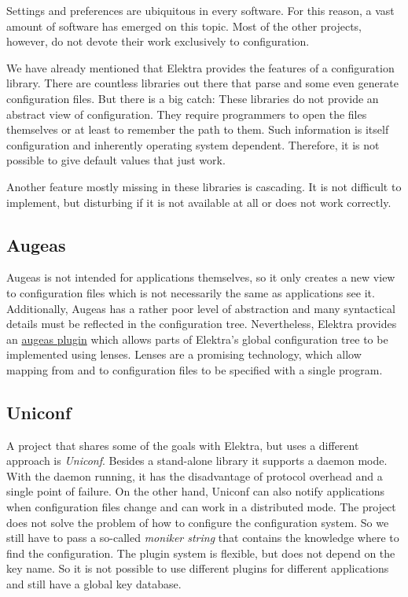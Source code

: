 Settings and preferences are ubiquitous in every software. For this reason, a vast amount of software has emerged on this topic. Most of the other projects, however, do not devote their work exclusively to configuration.

We have already mentioned that Elektra provides the features of a configuration library. There are countless libraries out there that parse and some even generate configuration files. But there is a big catch\+: These libraries do not provide an abstract view of configuration. They require programmers to open the files themselves or at least to remember the path to them. Such information is itself configuration and inherently operating system dependent. Therefore, it is not possible to give default values that just work.

Another feature mostly missing in these libraries is cascading. It is not difficult to implement, but disturbing if it is not available at all or does not work correctly.

\subsection*{Augeas}

Augeas is not intended for applications themselves, so it only creates a new view to configuration files which is not necessarily the same as applications see it. Additionally, Augeas has a rather poor level of abstraction and many syntactical details must be reflected in the configuration tree. Nevertheless, Elektra provides an \hyperlink{md_src_plugins_augeas_README_src_plugins_augeas_README_md}{augeas plugin} which allows parts of Elektra’s global configuration tree to be implemented using lenses. Lenses are a promising technology, which allow mapping from and to configuration files to be specified with a single program.

\subsection*{Uniconf}

A project that shares some of the goals with Elektra, but uses a different approach is {\itshape Uniconf}. Besides a stand-\/alone library it supports a daemon mode. With the daemon running, it has the disadvantage of protocol overhead and a single point of failure. On the other hand, Uniconf can also notify applications when configuration files change and can work in a distributed mode. The project does not solve the problem of how to configure the configuration system. So we still have to pass a so-\/called {\itshape moniker string} that contains the knowledge where to find the configuration. The plugin system is flexible, but does not depend on the key name. So it is not possible to use different plugins for different applications and still have a global key database.

